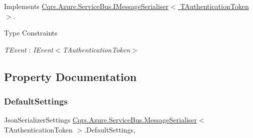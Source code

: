 Implements \hyperlink{interfaceCqrs_1_1Azure_1_1ServiceBus_1_1IMessageSerialiser_af6e1bca15164a08308969794b089c31b}{Cqrs.\+Azure.\+Service\+Bus.\+I\+Message\+Serialiser$<$ T\+Authentication\+Token $>$}.

\begin{Desc}
\item[Type Constraints]\begin{description}
\item[{\em T\+Event} : {\em I\+Event$<$T\+Authentication\+Token$>$}]\end{description}
\end{Desc}


\subsection{Property Documentation}
\mbox{\label{classCqrs_1_1Azure_1_1ServiceBus_1_1MessageSerialiser_a71ebae2d4d6352b19b49bd0115b99fcf}} 
\subsubsection{\texorpdfstring{Default\+Settings}{DefaultSettings}}
{\footnotesize\ttfamily Json\+Serializer\+Settings \hyperlink{classCqrs_1_1Azure_1_1ServiceBus_1_1MessageSerialiser}{Cqrs.\+Azure.\+Service\+Bus.\+Message\+Serialiser}$<$ T\+Authentication\+Token $>$.Default\+Settings\hspace{0.3cm}{\ttfamily [static]}, {\ttfamily [get]}}

